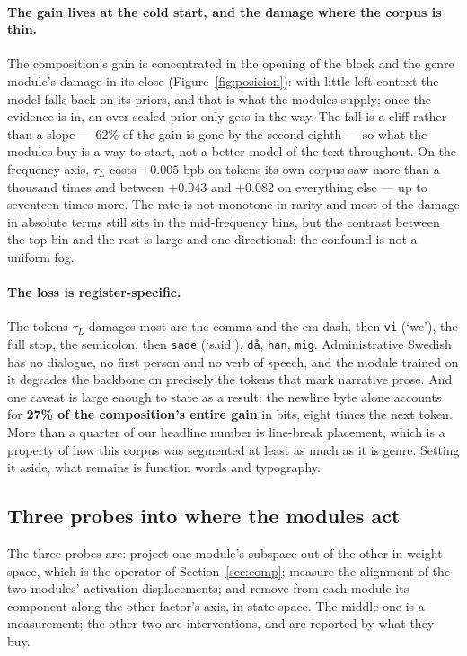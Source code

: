\documentclass[10pt,twocolumn,a4paper]{article}
\newcommand{\tec}[1]{{\small\texttt{#1}}}
\begin{document}
\paragraph{The gain lives at the cold start, and the damage where the corpus is
thin.} The composition's gain is concentrated in the opening of the block and
the genre module's damage in its close (Figure~\ref{fig:posicion}): with little
left context the model falls back on its priors, and that is what the modules
supply; once the evidence is in, an over-scaled prior only gets in the way. The
fall is a cliff rather than a slope --- 62\% of the gain is gone by the second
eighth --- so what the modules buy is a way to start, not a better model of the
text throughout. On the frequency
axis, $\tau_L$ costs $+0.005$ bpb on tokens its own corpus saw more than a
thousand times and between $+0.043$ and $+0.082$ on everything else --- up to
seventeen times more. The rate is not monotone in rarity and most of the damage
in absolute terms still sits in the mid-frequency bins, but the contrast between
the top bin and the rest is large and one-directional: the confound is not a
uniform fog.

\paragraph{The loss is register-specific.}
The tokens $\tau_L$ damages most are the comma and the em dash, then \tec{vi}
(`we'), the full stop, the semicolon, then \tec{sade} (`said'), \tec{då},
\tec{han}, \tec{mig}. Administrative Swedish has no dialogue, no first person
and no verb of speech, and the module trained on it degrades the backbone on
precisely the tokens that mark narrative prose. And one caveat is large
enough to state as a result: the newline byte alone accounts for \textbf{27\% of
the composition's entire gain} in bits, eight times the next token. More than a
quarter of our headline number is line-break placement, which is a property of
how this corpus was segmented at least as much as it is genre. Setting it aside, what
remains is function words and typography.

\subsection{Three probes into where the modules act}
\label{sec:interp}

The three probes are: project one module's subspace out of the other in weight
space, which is the operator of Section~\ref{sec:comp}; measure the alignment of
the two modules' activation displacements; and remove from each module its
component along the other factor's axis, in state space. The middle one is a
measurement; the other two are interventions, and are reported by what they buy.
\end{document}
